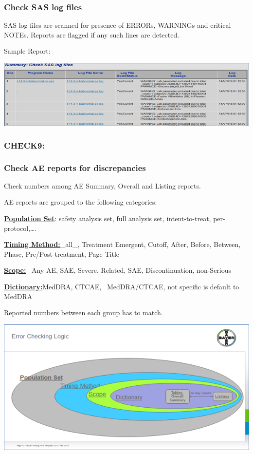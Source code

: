 \documentclass[
  letterpaper,
  DIV=11,
  numbers=noendperiod]{scrartcl}
\begin{document}
\hypertarget{check-sas-log-files}{%
\subsubsection{Check SAS log files}\label{check-sas-log-files}}

SAS log files are scanned for presence of ERRORs, WARNINGs and critical
NOTEs. Reports are flagged if any such lines are detected.

Sample Report:

\includegraphics{image/Picture9.png}

\hypertarget{check9}{%
\subsubsection{CHECK9:}\label{check9}}

\hypertarget{check-ae-reports-for-discrepancies}{%
\subsubsection{Check AE reports for
discrepancies}\label{check-ae-reports-for-discrepancies}}

Check numbers among AE Summary, Overall and Listing reports.

AE reports are grouped to the following categories:~~

\ul{\textbf{Population Set}}: safety analysis set, full analysis set,
intent-to-treat, per-protocol,\ldots.

\ul{\textbf{Timing Method:}}\_all\_, Treatment Emergent, Cutoff, After,
Before, Between, Phase, Pre/Post treatment, Page Title

\ul{\textbf{Scope:}}~ Any AE, SAE, Severe, Related, SAE,
Discontinuation, non-Serious

\ul{\textbf{Dictionary:}}MedDRA, CTCAE,~ MedDRA/CTCAE, not specific is
default to MedDRA

Reported numbers between each group has to match.

\includegraphics{image/Picture10.png}
\end{document}
